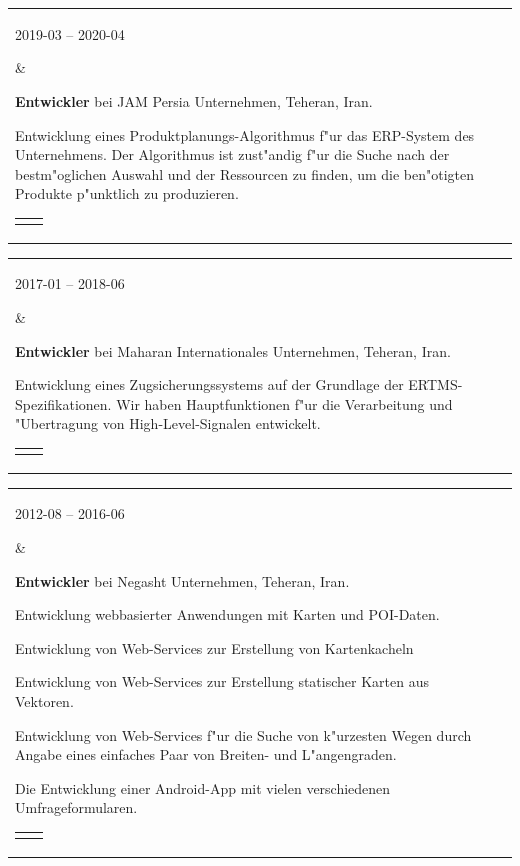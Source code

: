\documentclass[11pt,a4paper,oneside]{article}
\makeatletter
\newcommand{\prog}{Programmiersprache:}
\newcommand{\os}{Betriebssystem:}
\newcommand{\vcs}{Versionskontrollen:}
\newcommand{\issue}{Problemverfolgung:}
\newenvironment{mytable}{%
\begin{tabular}{@{}l@{\hspace{4mm}}l@{}}%
}{\end{tabular}}
\newcommand{\myitem}[2]{%
\parbox[t]{16mm}{#1}&\parbox[t]{16cm}{#2}\\%
}
\newenvironment{innertable}{%
\begin{tabular}{@{}l@{\hspace{5mm}}l@{}}%
}{\end{tabular}}
\newcommand{\inneritem}[2]{%
\parbox{35mm}{{\color{darkgray}#1}}&\parbox{12cm}{#2}\\%
}
\makeatother
\begin{document}
\begin{mytable}
\myitem{2019-03 -- 2020-04}{%
\textbf{Entwickler} bei
JAM Persia Unternehmen, Teheran, Iran.

Entwicklung eines Produktplanungs-Algorithmus f"ur das ERP-System
des Unternehmens.
Der Algorithmus ist zust"andig f"ur die Suche nach der bestm"oglichen
Auswahl und der Ressourcen zu finden, um die ben"otigten Produkte
p"unktlich zu produzieren.

\begin{innertable}
\inneritem{\prog}{C\#}
\inneritem{\os}{Windows}
\inneritem{\vcs}{SVN}
\inneritem{\issue}{Jira}
\end{innertable}
}
\end{mytable}

\begin{mytable}
\myitem{2017-01 -- 2018-06}{
\textbf{Entwickler} bei
Maharan Internationales Unternehmen, Teheran, Iran.

Entwicklung eines Zugsicherungssystems auf der Grundlage
der ERTMS-Spezifikationen.
Wir haben Hauptfunktionen f"ur die Verarbeitung und "Ubertragung
von High-Level-Signalen entwickelt.

\begin{innertable}
\inneritem{\prog}{C mit Frama-C}
\inneritem{\os}{Windows}
\inneritem{\vcs}{TFS}
\inneritem{\issue}{Microsoft Project}
\end{innertable}
}
\end{mytable}

\begin{mytable}
\myitem{2012-08 -- 2016-06}{
\textbf{Entwickler} bei
Negasht Unternehmen, Teheran, Iran.

Entwicklung webbasierter Anwendungen mit Karten und POI-Daten.

Entwicklung von Web-Services zur Erstellung von Kartenkacheln

Entwicklung von Web-Services zur Erstellung statischer Karten
aus Vektoren.

Entwicklung von Web-Services f"ur die Suche von k"urzesten Wegen
durch Angabe eines einfaches Paar von Breiten- und L"angengraden.

Die Entwicklung einer Android-App mit vielen verschiedenen
Umfrageformularen.

\begin{innertable}
\inneritem{\prog}{C\#, JavaScript, C++, und Java}
\inneritem{\os}{Windows}
\inneritem{\vcs}{Microsoft Visual SourceSafe}
\inneritem{\issue}{Unternehmensspezifische Fehlerverfolgung}
\end{innertable}
}
\end{mytable}
\end{document}
